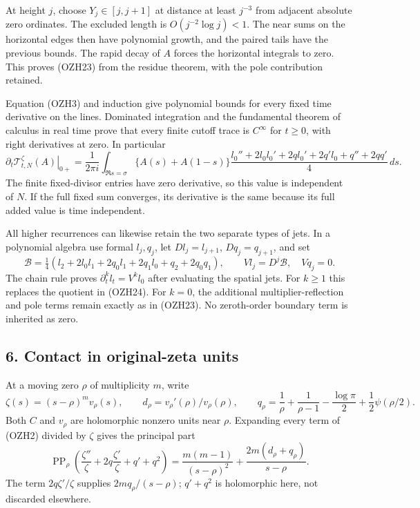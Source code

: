 \documentclass[
  10pt,
  a4paper,
]{article}
\begin{document}
At height \(j\), choose \(Y_j\in[j,j+1]\) at distance at least
\(j^{-3}\) from adjacent absolute zero ordinates. The excluded length is
\(O(j^{-2}\log j)<1\). The near sums on the horizontal edges then have
polynomial growth, and the paired tails have the previous bounds. The
rapid decay of \(A\) forces the horizontal integrals to zero. This
proves (OZH23) from the residue theorem, with the pole contribution
retained.

Equation (OZH3) and induction give polynomial bounds for every fixed
time derivative on the lines. Dominated integration and the fundamental
theorem of calculus in real time prove that every finite cutoff trace is
\(C^\infty\) for \(t\ge0\), with right derivatives at zero. In
particular \[
\boxed{
\left.\partial_t\mathcal T_{t,N}^\zeta(A)\right|_{0+}
=\frac1{2\pi i}\int_{\Re s=\sigma}
\{A(s)+A(1-s)\}
\frac{l_0''+2l_0l_0'+2q l_0'+2q'l_0+q''+2qq'}4\,ds.}
\tag{OZH24}
\] The finite fixed-divisor entries have zero derivative, so this value
is independent of \(N\). If the full fixed sum converges, its derivative
is the same because its full added value is time independent.

All higher recurrences can likewise retain the two separate types of
jets. In a polynomial algebra use formal \(l_j,q_j\), let
\(Dl_j=l_{j+1}\), \(Dq_j=q_{j+1}\), and set \[
\mathcal B=\tfrac14(l_2+2l_0l_1+2q_0l_1+2q_1l_0+q_2+2q_0q_1),
\qquad Vl_j=D^j\mathcal B,\quad Vq_j=0.
\tag{OZH25}
\] The chain rule proves \(\partial_t^k l_t=V^k l_0\) after evaluating
the spatial jets. For \(k\ge1\) this replaces the quotient in (OZH24).
For \(k=0\), the additional multiplier-reflection and pole terms remain
exactly as in (OZH23). No zeroth-order boundary term is inherited as
zero.

\subsection{6. Contact in original-zeta
units}\label{contact-in-original-zeta-units}

At a moving zero \(\rho\) of multiplicity \(m\), write \[
\zeta(s)=(s-\rho)^m v_\rho(s),\qquad
d_\rho=v_\rho'(\rho)/v_\rho(\rho),\qquad
q_\rho=\frac1\rho+\frac1{\rho-1}-\frac{\log\pi}2+
\frac12\psi(\rho/2).
\tag{OZH26}
\] Both \(C\) and \(v_\rho\) are holomorphic nonzero units near
\(\rho\). Expanding every term of (OZH2) divided by \(\zeta\) gives the
principal part \[
\operatorname{PP}_\rho
\left(\frac{\zeta''}{\zeta}+2q\frac{\zeta'}{\zeta}+q'+q^2\right)
=\frac{m(m-1)}{(s-\rho)^2}
+\frac{2m(d_\rho+q_\rho)}{s-\rho}.
\tag{OZH27}
\] The term \(2q\zeta'/\zeta\) supplies \(2mq_\rho/(s-\rho)\);
\(q'+q^2\) is holomorphic here, not discarded elsewhere.
\end{document}
